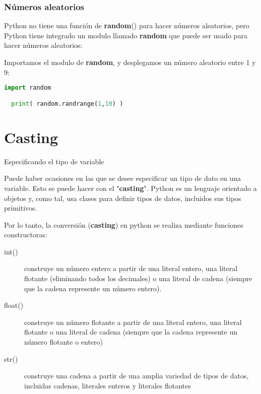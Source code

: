 \begin{frame}[fragile]
  \frametitle{Números aleatorios}

  Python no tiene una función de \textbf{random}() para
  hacer números aleatorios, pero Python tiene integrado un modulo llamado
  \textbf{random} que puede ser usado para hacer números
  aleatorios:

  \vspace{\baselineskip}
  Importamos el modulo de \textbf{random}, y desplegamos un número aleatorio entre 1
  y 9:

  \begin{lstlisting}[language=Python]
  import random

  print( random.randrange(1,10) )
  \end{lstlisting}
\end{frame}

\section{Casting}

\begin{frame}[c]{Especificando el tipo de variable}

  \vspace{\baselineskip}
  Puede haber ocasiones en las que se desee especificar un tipo de dato en una
  variable. Esto se puede hacer con el "\textbf{casting}". Python es un
  lenguaje orientado a objetos y, como tal, usa clases para definir tipos de
  datos, incluidos sus tipos primitivos.

  \pausa
  \vspace{\baselineskip}
  Por lo tanto, la conversión (\textbf{casting}) en python se realiza
  mediante funciones constructoras:

  \vspace{\baselineskip}
  \begin{description}
    \item[int()] construye un número entero a partir de una literal entero,
      una literal flotante (eliminando todos los decimales) o una literal
      de cadena (siempre que la cadena represente un número entero).
    \pausa
    \item[float()] construye un número flotante a partir de una literal
      entero, una literal flotante o una literal de cadena (siempre que la
      cadena represente un número flotante o entero)
    \pausa
    \item[str()] construye una cadena a partir de una amplia variedad de
      tipos de datos, incluidas cadenas, literales enteros y literales
      flotantes
  \end{description}
\end{frame}

